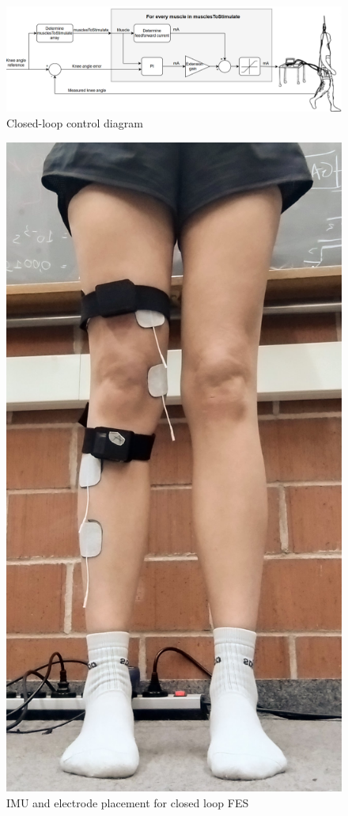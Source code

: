 \begin{figure} [H]
    \centering
    \includegraphics[width=1.1\linewidth]{images/controldiam3.png}
    \caption{Closed-loop control diagram}
    \label{fig:cldiam}
\end{figure}
\newpage
\begin{figure}
    \centering
    \includegraphics[width=\linewidth]{images/clsetupimg.jpg}
    \caption{IMU and electrode placement for closed loop FES}
    \label{fig:clsetupimg}
\end{figure}


